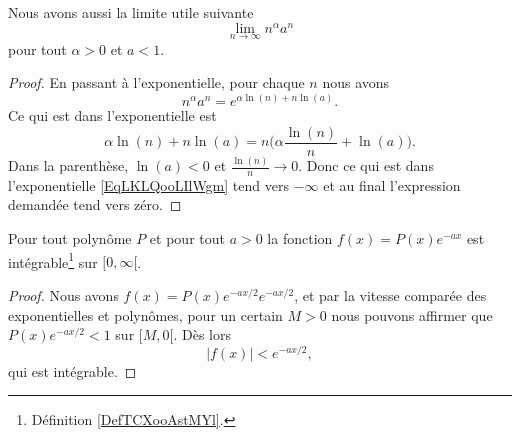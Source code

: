 \begin{lemma}       \label{LemVKDKooEftNzG}
    Nous avons aussi la limite utile suivante 
    \begin{equation}
        \lim_{n\to \infty} n^{\alpha}a^n
    \end{equation}
    pour tout \( \alpha>0\) et \( a<1\).
\end{lemma}

\begin{proof}
    En passant à l'exponentielle, pour chaque \( n\) nous avons
    \begin{equation}        \label{EqLKLQooLIlWgm}
        n^{\alpha}a^n= e^{\alpha\ln(n)+n\ln(a)}.
    \end{equation}
    Ce qui est dans l'exponentielle est
    \begin{equation}
        \alpha\ln(n)+n\ln(a)=n\big(\alpha \frac{ \ln(n) }{ n }+\ln(a) \big).
    \end{equation}
    Dans la parenthèse, \( \ln(a)<0\) et \( \frac{ \ln(n) }{ n }\to 0\). Donc ce qui est dans l'exponentielle \eqref{EqLKLQooLIlWgm} tend vers \( -\infty\) et au final l'expression demandée tend vers zéro.
\end{proof}

\begin{proposition} \label{PropBQGBooHxNrrf}
    Pour tout polynôme \( P\) et pour tout \( a>0\) la fonction \( f(x)=P(x) e^{-ax}\) est intégrable\footnote{Définition \ref{DefTCXooAstMYl}.} sur \( \mathopen[ 0 , \infty [\).
\end{proposition}

\begin{proof}
    Nous avons \( f(x)=P(x) e^{-ax/2} e^{-ax/2}\), et par la vitesse comparée des exponentielles et polynômes, pour un certain \( M>0\) nous pouvons affirmer que \( P(x) e^{-ax/2}<1\) sur \( \mathopen[ M , 0 [\). Dès lors
        \begin{equation}
            | f(x) |< e^{-ax/2},
        \end{equation}
        qui est intégrable.
\end{proof}

